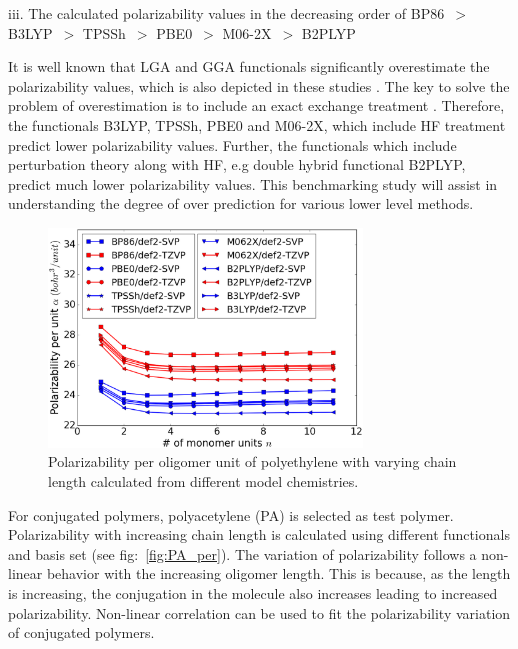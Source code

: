 iii. The calculated polarizability values in the decreasing order of BP86\ $>$ B3LYP\ $>$ TPSSh\ $>$ PBE0\ $>$ M06-2X\ $>$ B2PLYP

It is well known that LGA and GGA functionals significantly overestimate the polarizability values, which is also depicted in these studies . The key to solve the problem of overestimation is to include an exact exchange treatment \cite{Mori-Sanchez2003}. Therefore, the functionals  B3LYP, TPSSh, PBE0 and M06-2X, which include HF treatment predict lower polarizability values. Further, the functionals which include perturbation theory along with HF, e.g double hybrid functional B2PLYP, predict much lower polarizability values. 
This benchmarking study will assist in understanding the degree of over prediction for various lower level methods.

\begin{figure}[htbp] 
	\centering
	\includegraphics[width=0.744\textwidth]{Chapter-3/Figures/PE_per.eps}
	\caption{Polarizability per oligomer unit of polyethylene with varying chain length calculated from different model chemistries.} 
	\label{fig:PE_per} 
\end{figure}  

For conjugated polymers, polyacetylene (PA) is selected as test polymer. Polarizability with increasing chain length is calculated using different functionals and basis set (see fig:\ \ref{fig:PA_per}). The variation of polarizability follows a non-linear behavior with the increasing oligomer length. This is because, as the length is increasing, the conjugation in the molecule also increases leading to increased polarizability. Non-linear correlation can be used to fit the polarizability variation of conjugated polymers. 

